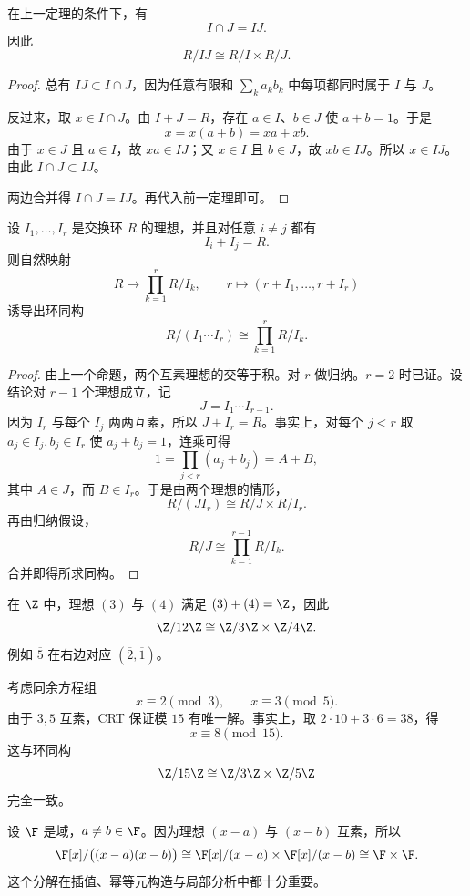\begin{proposition}
在上一定理的条件下，有
\[
I\cap J=IJ.
\]
因此
\[
R/IJ\cong R/I\times R/J.
\]
\end{proposition}

\begin{proof}
总有 $IJ\subset I\cap J$，因为任意有限和 $\sum_k a_kb_k$ 中每项都同时属于 $I$ 与 $J$。

反过来，取 $x\in I\cap J$。由 $I+J=R$，存在 $a\in I$、$b\in J$ 使 $a+b=1$。于是
\[
x=x(a+b)=xa+xb.
\]
由于 $x\in J$ 且 $a\in I$，故 $xa\in IJ$；又 $x\in I$ 且 $b\in J$，故 $xb\in IJ$。所以 $x\in IJ$。由此 $I\cap J\subset IJ$。

两边合并得 $I\cap J=IJ$。再代入前一定理即可。
\end{proof}

\begin{theorem}[有限个两两互素理想的情形]
设 $I_1,\dots,I_r$ 是交换环 $R$ 的理想，并且对任意 $i\neq j$ 都有
\[
I_i+I_j=R.
\]
则自然映射
\[
R\longrightarrow \prod_{k=1}^r R/I_k,
\qquad r\longmapsto (r+I_1,\dots,r+I_r)
\]
诱导出环同构
\[
R/(I_1\cdots I_r)\cong \prod_{k=1}^r R/I_k.
\]
\end{theorem}

\begin{proof}
由上一个命题，两个互素理想的交等于积。对 $r$ 做归纳。$r=2$ 时已证。设结论对 $r-1$ 个理想成立，记
\[
J=I_1\cdots I_{r-1}.
\]
因为 $I_r$ 与每个 $I_j$ 两两互素，所以 $J+I_r=R$。事实上，对每个 $j<r$ 取 $a_j\in I_j,b_j\in I_r$ 使 $a_j+b_j=1$，连乘可得
\[
1=\prod_{j<r}(a_j+b_j)=A+B,
\]
其中 $A\in J$，而 $B\in I_r$。于是由两个理想的情形，
\[
R/(JI_r)\cong R/J\times R/I_r.
\]
再由归纳假设，
\[
R/J\cong \prod_{k=1}^{r-1}R/I_k.
\]
合并即得所求同构。
\end{proof}

\begin{example}
在 $\Z$ 中，理想 $(3)$ 与 $(4)$ 满足 $(3)+(4)=\Z$，因此
\[
\Z/12\Z\cong \Z/3\Z\times \Z/4\Z.
\]
例如 $\overline{5}$ 在右边对应 $(\overline{2},\overline{1})$。
\end{example}

\begin{example}
考虑同余方程组
\[
x\equiv 2\pmod 3,
\qquad
x\equiv 3\pmod 5.
\]
由于 $3,5$ 互素，CRT 保证模 $15$ 有唯一解。事实上，取 $2\cdot 10+3\cdot 6=38$，得
\[
x\equiv 8\pmod{15}.
\]
这与环同构
\[
\Z/15\Z\cong \Z/3\Z\times \Z/5\Z
\]
完全一致。
\end{example}

\begin{example}
设 $\F$ 是域，$a\neq b\in \F$。因为理想 $(x-a)$ 与 $(x-b)$ 互素，所以
\[
\F[x]/\bigl((x-a)(x-b)\bigr)
\cong
\F[x]/(x-a)\times \F[x]/(x-b)
\cong \F\times \F.
\]
这个分解在插值、幂等元构造与局部分析中都十分重要。
\end{example}

